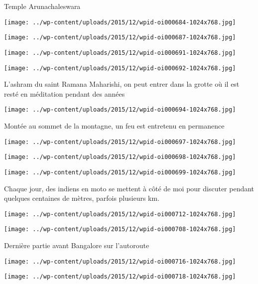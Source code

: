 Temple Arunachaleswara 
\begin{center} \texttt{[image: ../wp-content/uploads/2015/12/wpid-oi000684-1024x768.jpg]} \end{center}
\begin{center} \texttt{[image: ../wp-content/uploads/2015/12/wpid-oi000687-1024x768.jpg]} \end{center}
\begin{center} \texttt{[image: ../wp-content/uploads/2015/12/wpid-oi000691-1024x768.jpg]} \end{center}
\begin{center} \texttt{[image: ../wp-content/uploads/2015/12/wpid-oi000692-1024x768.jpg]} \end{center}

L'ashram du saint Ramana Maharishi, on peut entrer dans la grotte où il est resté en méditation pendant des années 
\begin{center} \texttt{[image: ../wp-content/uploads/2015/12/wpid-oi000694-1024x768.jpg]} \end{center}
\pagebreak

Montée au sommet de la montagne, un feu est entretenu en permanence 
\begin{center} \texttt{[image: ../wp-content/uploads/2015/12/wpid-oi000697-1024x768.jpg]} \end{center}
\begin{center} \texttt{[image: ../wp-content/uploads/2015/12/wpid-oi000698-1024x768.jpg]} \end{center}
\begin{center} \texttt{[image: ../wp-content/uploads/2015/12/wpid-oi000699-1024x768.jpg]} \end{center}

Chaque jour, des indiens en moto se mettent à côté de moi pour discuter pendant quelques centaines de mètres, parfois plusieurs km. 
\begin{center} \texttt{[image: ../wp-content/uploads/2015/12/wpid-oi000712-1024x768.jpg]} \end{center}
\begin{center} \texttt{[image: ../wp-content/uploads/2015/12/wpid-oi000708-1024x768.jpg]} \end{center}

Dernière partie avant Bangalore sur l'autoroute 
\begin{center} \texttt{[image: ../wp-content/uploads/2015/12/wpid-oi000716-1024x768.jpg]} \end{center}
\begin{center} \texttt{[image: ../wp-content/uploads/2015/12/wpid-oi000718-1024x768.jpg]} \end{center}

